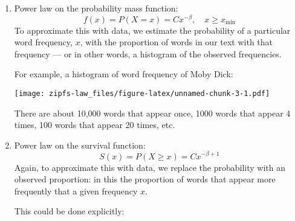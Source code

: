 \documentclass[]{article}
\newenvironment{Shaded}{\begin{snugshade}}{\end{snugshade}}
\newcommand{\DataTypeTok}[1]{\textcolor[rgb]{0.13,0.29,0.53}{#1}}
\newcommand{\FloatTok}[1]{\textcolor[rgb]{0.00,0.00,0.81}{#1}}
\newcommand{\KeywordTok}[1]{\textcolor[rgb]{0.13,0.29,0.53}{\textbf{#1}}}
\newcommand{\NormalTok}[1]{#1}
\newcommand{\OperatorTok}[1]{\textcolor[rgb]{0.81,0.36,0.00}{\textbf{#1}}}
\newcommand{\StringTok}[1]{\textcolor[rgb]{0.31,0.60,0.02}{#1}}
\begin{document}
\begin{enumerate}
\def\labelenumi{\arabic{enumi}.}
\item
  Power law on the probability mass function: \[
   f(x) = P(X = x) = C x^{-\beta}, \quad x \ge x_\text{min}
   \] To approximate this with data, we estimate the probability of a
  particular word frequency, \(x\), with the proportion of words in our
  text with that frequency --- or in other words, a histogram of the
  observed frequencies.

  For example, a histogram of word frequency of Moby Dick:

\begin{Shaded}
\end{Shaded}

  \texttt{[image: zipfs-law\_files/figure-latex/unnamed-chunk-3-1.pdf]}

  There are about 10,000 words that appear once, 1000 words that appear
  4 times, 100 words that appear 20 times, etc.
\item
  Power law on the survival function: \[
  S(x) = P(X \ge x) = C x^{-\beta + 1}
  \] Again, to approximate this with data, we replace the probability
  with an observed proportion: in this the proportion of words that
  appear more frequently that a given frequency \(x\).

  This could be done explicitly:


\end{enumerate}
\end{document}
